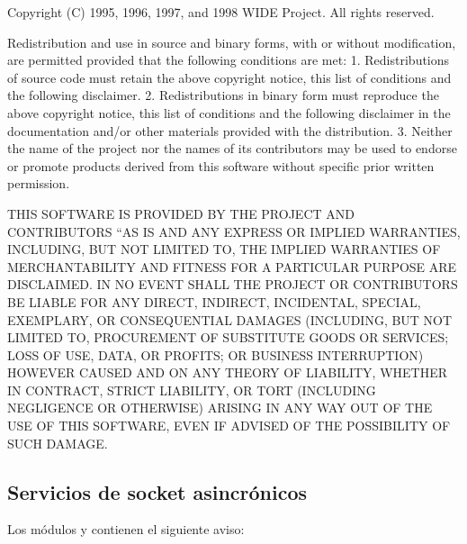 \documentclass[a4,10pt,spanish]{sphinxmanual}
\begin{document}
\begin{sphinxVerbatim}[commandchars=\\\{\}]
Copyright (C) 1995, 1996, 1997, and 1998 WIDE Project.
All rights reserved.

Redistribution and use in source and binary forms, with or without
modification, are permitted provided that the following conditions
are met:
1. Redistributions of source code must retain the above copyright
   notice, this list of conditions and the following disclaimer.
2. Redistributions in binary form must reproduce the above copyright
   notice, this list of conditions and the following disclaimer in the
   documentation and/or other materials provided with the distribution.
3. Neither the name of the project nor the names of its contributors
   may be used to endorse or promote products derived from this software
   without specific prior written permission.

THIS SOFTWARE IS PROVIDED BY THE PROJECT AND CONTRIBUTORS ``AS IS\PYGZsq{}\PYGZsq{} AND
ANY EXPRESS OR IMPLIED WARRANTIES, INCLUDING, BUT NOT LIMITED TO, THE
IMPLIED WARRANTIES OF MERCHANTABILITY AND FITNESS FOR A PARTICULAR PURPOSE
ARE DISCLAIMED.  IN NO EVENT SHALL THE PROJECT OR CONTRIBUTORS BE LIABLE
FOR ANY DIRECT, INDIRECT, INCIDENTAL, SPECIAL, EXEMPLARY, OR CONSEQUENTIAL
DAMAGES (INCLUDING, BUT NOT LIMITED TO, PROCUREMENT OF SUBSTITUTE GOODS
OR SERVICES; LOSS OF USE, DATA, OR PROFITS; OR BUSINESS INTERRUPTION)
HOWEVER CAUSED AND ON ANY THEORY OF LIABILITY, WHETHER IN CONTRACT, STRICT
LIABILITY, OR TORT (INCLUDING NEGLIGENCE OR OTHERWISE) ARISING IN ANY WAY
OUT OF THE USE OF THIS SOFTWARE, EVEN IF ADVISED OF THE POSSIBILITY OF
SUCH DAMAGE.
\end{sphinxVerbatim}


\subsection{Servicios de socket asincrónicos}
\label{\detokenize{license:asynchronous-socket-services}}
\sphinxAtStartPar
Los módulos  y  contienen el siguiente aviso:
\end{document}

